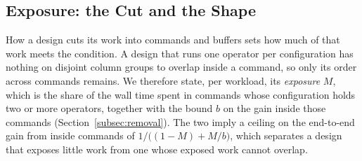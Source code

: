 \subsection{Exposure: the Cut and the Shape}
\label{subsec:exposure}

How a design cuts its work into commands and buffers sets how much of that work meets the condition.
A design that runs one operator per configuration has nothing on disjoint column groups to overlap inside a command, so only its order across commands remains.
We therefore state, per workload, its \emph{exposure} $M$, which is the share of the wall time spent in commands whose configuration holds two or more operators, together with the bound $b$ on the gain inside those commands (Section~\ref{subsec:removal}).
The two imply a ceiling on the end-to-end gain from inside commands of $1 / \bigl((1 - M) + M / b\bigr)$, which separates a design that exposes little work from one whose exposed work cannot overlap.

